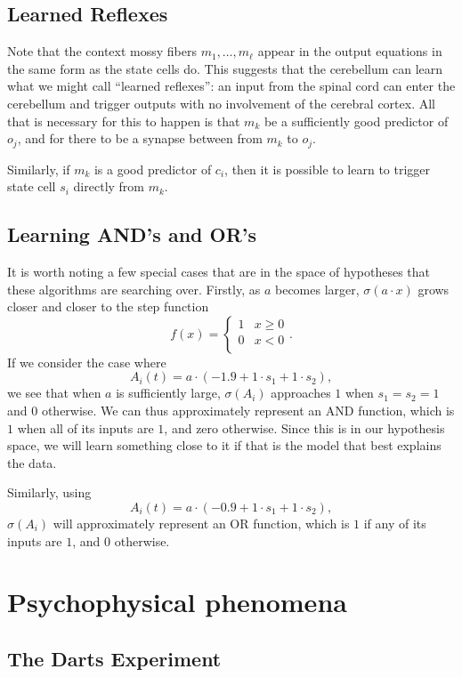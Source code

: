 \documentclass{article}
\theoremstyle{definition}
\begin{document}
\subsection{Learned Reflexes}

Note that the context mossy fibers $m_1, \dots, m_\ell$ appear in the
output equations in the same form as the state cells do. This suggests
that the cerebellum can learn what we might call ``learned reflexes'':
an input from the spinal cord can enter the cerebellum and trigger
outputs with no involvement of the cerebral cortex. All that is
necessary for this to happen is that $m_k$ be a sufficiently good
predictor of $o_j$, and for there to be a synapse between from $m_k$
to $o_j$.

Similarly, if $m_k$ is a good predictor of $c_i$, then it is possible
to learn to trigger state cell $s_i$ directly from $m_k$.

\subsection{Learning AND's and OR's}

It is worth noting a few special cases that are in the space of
hypotheses that these algorithms are searching over. Firstly, as $a$
becomes larger, $\sigma(a\cdot x)$ grows closer and closer to the step
function 
$$f(x) = \begin{cases} 1 & x\ge 0\\
0 & x < 0\\ \end{cases}.$$
If we consider the case where
$$A_i(t) = a\cdot (-1.9 + 1 \cdot s_1 + 1\cdot s_2),$$ we see that
when $a$ is sufficiently large, $\sigma(A_i)$ approaches $1$ when
$s_1=s_2=1$ and $0$ otherwise. We can thus approximately represent an
AND function, which is $1$ when all of its inputs are $1$, and zero
otherwise. Since this is in our hypothesis space, we will learn
something close to it if that is the model that best explains the
data.

Similarly, using $$A_i(t) = a \cdot (-0.9 + 1 \cdot s_1 + 1 \cdot
s_2),$$ $\sigma(A_i)$ will approximately represent an OR function,
which is $1$ if any of its inputs are $1$, and $0$ otherwise.


\section{Psychophysical phenomena}

\subsection{The Darts Experiment}
\end{document}
